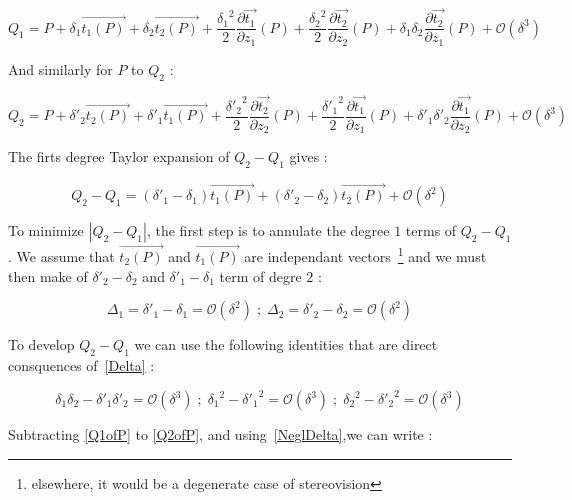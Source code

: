 \documentclass{ipol}
\newcommand{\BigV}[1]{\ensuremath{\overrightarrow{#1}}}
\newcommand{\TanO}[1]{\BigV{t_1#1}}
\newcommand{\TanT}[1]{\BigV{t_2#1}}
\newcommand{\Negl}[1]{\ensuremath{\mathcal{O}(#1)}}
\newcommand{\DerPart}[2]{\frac{\partial #1}{\partial #2}}
\begin{document}
\begin{equation}
    Q_1 =    P +  \delta_1 \TanO{(P)} 
               +  \delta_2 \TanT{(P)} 
               + \frac{{\delta_1}^2}{2} \DerPart { \TanO{}}{z_1}(P) 
               + \frac{{\delta_2}^2}{2} \DerPart { \TanT{}}{z_2}(P) 
               +  \delta_1  \delta_2  \DerPart { \TanT{}}{z_1}(P)  
               + \Negl{\delta^3}
       \label{Q1ofP}
\end{equation}

And similarly for $P$ to $Q_2$ :

\begin{equation}
    Q_2 =    P +  \delta'_2 \TanT{(P)} 
               +  \delta'_1 \TanO{(P)} 
               + \frac{{\delta'_2}^2}{2} \DerPart { \TanT{}}{z_2}(P) 
               + \frac{{\delta'_1}^2}{2} \DerPart { \TanO{}}{z_1}(P) 
               +  \delta'_1  \delta'_2  \DerPart { \TanO{}}{z_2}(P)  
               + \Negl{\delta^3}
       \label{Q2ofP}
\end{equation}

The firts degree Taylor expansion of $Q_2-Q_1$ gives :

\begin{equation}
    Q_2 -Q_1 =   (\delta'_1 -\delta_1) \TanO{(P)} +  (\delta'_2 -\delta_2) \TanT{(P)}  + \Negl{\delta^2}
\end{equation}

To minimize $|Q_2 -Q_1|$, the first step is to annulate the degree $1$ terms of $ Q_2 -Q_1$ . We assume
that $\TanT{(P)}$ and $\TanO{(P)}$  are independant vectors~\footnote{elsewhere, it would be a 
degenerate case of stereovision} and we must then make of $\delta'_2 -\delta_2$ and $\delta'_1 -\delta_1$
term of degre $2$ :

\begin{equation}
   \Delta_1 =   \delta'_1 -\delta_1 = \Negl{\delta^2}  \; ; \; \Delta_2 =   \delta'_2 -\delta_2 = \Negl{\delta^2}
   \label{Delta}
\end{equation}

To develop $ Q_2 -Q_1$ we can use the following identities  that are direct consquences of~\ref{Delta} :

\begin{equation}
   \delta_1  \delta_2 -  \delta'_1  \delta'_2  = \Negl{\delta^3} \;;\;
   {\delta_1}^2 - {\delta'_1}^2 =  \Negl{\delta^3} \;;\;
   {\delta_2}^2 - {\delta'_2}^2 =  \Negl{\delta^3} 
   \label{NeglDelta}
\end{equation}

Subtracting \ref{Q1ofP} to \ref{Q2ofP}, and using~\ref{NeglDelta},we can write :
\end{document}
